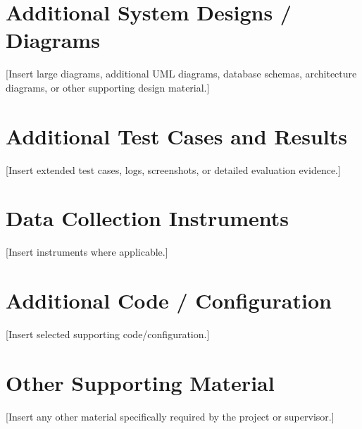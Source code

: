 \documentclass[12pt,a4paper]{report}
\begin{document}
\chapter{Additional System Designs / Diagrams}
[Insert large diagrams, additional UML diagrams, database schemas,
architecture diagrams, or other supporting design material.]

\chapter{Additional Test Cases and Results}
[Insert extended test cases, logs, screenshots, or detailed evaluation evidence.]

\chapter{Data Collection Instruments}
[Insert instruments where applicable.]

\chapter{Additional Code / Configuration}
[Insert selected supporting code/configuration.]

\chapter{Other Supporting Material}
[Insert any other material specifically required by the project or supervisor.]
\end{document}
